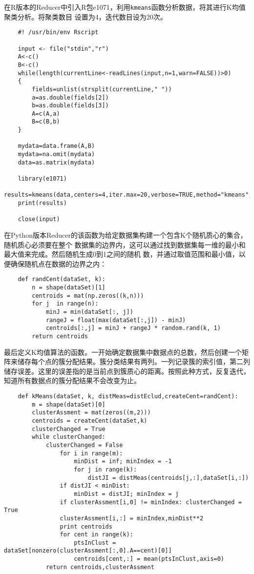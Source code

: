 在R版本的Reducer中引入R包e1071，利用\lstinline|kmeans|函数分析数据，将其进行K均值聚类分析。将聚类数目
设置为4，迭代数目设为20次。

\begin{lstlisting}
	#! /usr/bin/env Rscript

	input <- file("stdin","r")
	A<-c()
	B<-c()
	while(length(currentLine<-readLines(input,n=1,warn=FALSE))>0)
	{
	    fields=unlist(strsplit(currentLine," "))
	    a=as.double(fields[2])
	    b=as.double(fields[3])
	    A=c(A,a)
	    B=c(B,b)
	}

	mydata=data.frame(A,B)
	mydata=na.omit(mydata)
	data=as.matrix(mydata)

	library(e1071)
	results=kmeans(data,centers=4,iter.max=20,verbose=TRUE,method="kmeans",m=2)
	print(results)

	close(input)
\end{lstlisting}

在Python版本Reducer的该函数为给定数据集构建一个包含K个随机质心的集合，随机质心必须要在整个
数据集的边界内，这可以通过找到数据集每一维的最小和最大值来完成。然后随机生成0到1之间的随机
数，并通过取值范围和最小值，以便确保随机点在数据的边界之内：

\begin{lstlisting}
	def randCent(dataSet, k):
	    n = shape(dataSet)[1]
	    centroids = mat(np.zeros((k,n)))
	    for j  in range(n):
	        minJ = min(dataSet[:, j])
	        rangeJ = float(max(dataSet[:,j]) - minJ)
	        centroids[:,j] = minJ + rangeJ * random.rand(k, 1)
	    return centroids
\end{lstlisting}

最后定义K均值算法的函数。一开始确定数据集中数据点的总数，然后创建一个矩阵来储存每个点的簇分配结果。簇分类结果有两列。一列记录簇的索引值，第二列储存误差。这里的误差指的是当前点到簇质心的距离。按照此种方式，反复迭代，知道所有数据点的簇分配结果不会改变为止。

\begin{lstlisting}
	def kMeans(dataSet, k, distMeas=distEclud,createCent=randCent):
	    m = shape(dataSet)[0]
	    clusterAssment = mat(zeros((m,2)))
	    centroids = createCent(dataSet,k)
	    clusterChanged = True
	    while clusterChanged:
	        clusterChanged = False
	            for i in range(m):
	                minDist = inf; minIndex = -1
	                for j in range(k):
	                    distJI = distMeas(centroids[j,:],dataSet[i,:])
	            if distJI < minDist:
	                minDist = distJI; minIndex = j
	            if clusterAssment[i,0] != minIndex: clusterChanged = True
	            clusterAssment[i,:] = minIndex,minDist**2
	            print centroids
	            for cent in range(k):
	                ptsInClust = dataSet[nonzero(clusterAssment[:,0].A==cent)[0]]
	                centroids[cent,:] = mean(ptsInClust,axis=0)
	        return centroids,clusterAssment
\end{lstlisting}


